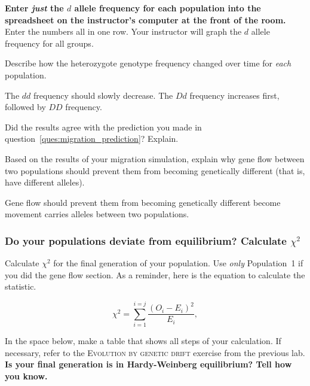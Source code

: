 \documentclass[12pt, hidelinks]{exam}
\newcommand*\AnswerBox[2]{%
    \parbox[t][#1]{0.92\textwidth}{%
    \begin{solution}#2\end{solution}}
    \vspace{\stretch{1}}
}
\newlength{\basespace}
\newcommand{\allele}[1]{$#1$}
\begin{document}
\begin{questions}
\begin{enumerate}
\end{enumerate}

\question
\textbf{Enter \emph{just} the \allele{d} allele frequency for each population into the spreadsheet on the instructor's
computer at the front of the room.}  Enter the numbers all 
in one row. Your instructor will graph the \allele{d} allele frequency for 
all groups.



\question
Describe how the heterozygote genotype frequency changed over time for \emph{each} population.

\AnswerBox{0.5\basespace}{The \allele{dd} frequency should slowly decrease. The \allele{Dd} frequency increases first, followed by \allele{DD} frequency.}

\question
Did the results agree with the prediction you made in question~\ref{ques:migration_prediction}? Explain.

\AnswerBox{0.1\basespace}{%
}

\question[Checkout]
Based on the results of your migration simulation, explain why gene flow between two populations should prevent them from becoming genetically different (that is, have different alleles).

\AnswerBox{4\baselineskip}{Gene flow should prevent them from becoming genetically different become movement carries alleles between two populations.}


\subsubsection*{Do your populations deviate from equilibrium? Calculate $\chi^2$}\label{sec:chi_square}

\question[Checkout] \label{ques:chi-square}
Calculate $\chi^2$ for the final generation of your population. Use \emph{only} Population~1 if you did the gene flow section. As a reminder, here is the equation to calculate the statistic.

\[\chi^2 = \sum_{i=1}^{i=j}\frac{(O_i - E_i)^2}{E_i}, \]

In the space below, make a table that shows all steps of your calculation. If necessary, refer to the \textsc{Evolution by genetic drift} exercise from the previous lab. \textbf{Is your final generation is in Hardy-Weinberg equilibrium? Tell how you know.}

\AnswerBox{4\basespace}{%
}
\newpage


\end{questions}
\end{document}
